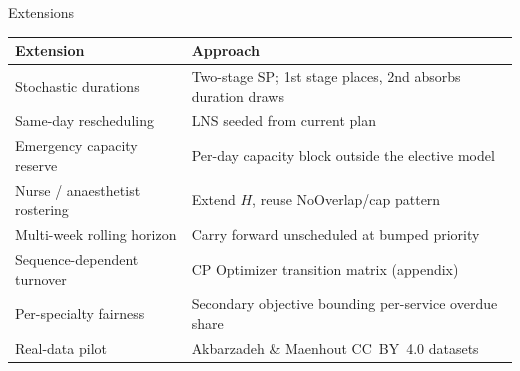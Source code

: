 \documentclass[10pt,aspectratio=169]{beamer}
\newcommand{\bk}{\hfill\hyperlink{toc}{\beamerreturnbutton{Agenda}}}
\begin{document}
\begin{frame}{Extensions}
  \begin{center}\small
  \begin{tabular}{ll}
    \toprule
    Extension & Approach \\
    \midrule
    Stochastic durations & Two-stage SP; 1st stage places, 2nd absorbs duration draws \\
    Same-day rescheduling & LNS seeded from current plan \\
    Emergency capacity reserve & Per-day capacity block outside the elective model \\
    Nurse / anaesthetist rostering & Extend $H$, reuse NoOverlap/cap pattern \\
    Multi-week rolling horizon & Carry forward unscheduled at bumped priority \\
    Sequence-dependent turnover & CP Optimizer transition matrix (appendix) \\
    Per-specialty fairness & Secondary objective bounding per-service overdue share \\
    Real-data pilot & Akbarzadeh \& Maenhout CC~BY~4.0 datasets \\
    \bottomrule
  \end{tabular}
  \end{center}
  \bk
\end{frame}
\end{document}
